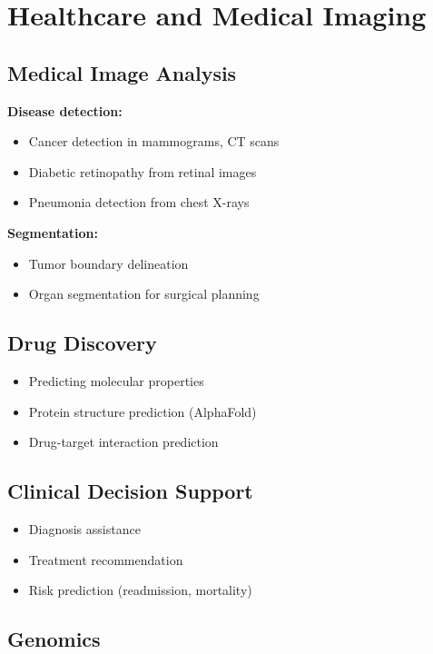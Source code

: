 \section{Healthcare and Medical Imaging}
\label{sec:healthcare-applications}

\subsection{Medical Image Analysis}

\textbf{Disease detection:}
\begin{itemize}
    \item Cancer detection in mammograms, CT scans
    \item Diabetic retinopathy from retinal images
    \item Pneumonia detection from chest X-rays
\end{itemize}

\textbf{Segmentation:}
\begin{itemize}
    \item Tumor boundary delineation
    \item Organ segmentation for surgical planning
\end{itemize}

\subsection{Drug Discovery}

\begin{itemize}
    \item Predicting molecular properties
    \item Protein structure prediction (AlphaFold)
    \item Drug-target interaction prediction
\end{itemize}

\subsection{Clinical Decision Support}

\begin{itemize}
    \item Diagnosis assistance
    \item Treatment recommendation
    \item Risk prediction (readmission, mortality)
\end{itemize}

\subsection{Genomics}

